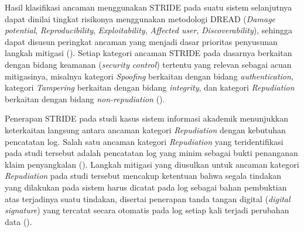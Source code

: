 Hasil klasifikasi ancaman menggunakan STRIDE pada suatu sistem selanjutnya dapat dinilai tingkat risikonya menggunakan metodologi DREAD (\textit{Damage potential}, \textit{Reproducibility}, \textit{Exploitability}, \textit{Affected user}, \textit{Discoverability}), sehingga dapat disusun peringkat ancaman yang menjadi dasar prioritas penyusunan langkah mitigasi (\cite{laksono2021stride}). Setiap kategori ancaman STRIDE pada dasarnya berkaitan dengan bidang keamanan (\textit{security control}) tertentu yang relevan sebagai acuan mitigasinya, misalnya kategori \textit{Spoofing} berkaitan dengan bidang \textit{authentication}, kategori \textit{Tampering} berkaitan dengan bidang \textit{integrity}, dan kategori \textit{Repudiation} berkaitan dengan bidang \textit{non-repudiation} (\cite{laksono2021stride}).

Penerapan STRIDE pada studi kasus sistem informasi akademik menunjukkan keterkaitan langsung antara ancaman kategori \textit{Repudiation} dengan kebutuhan pencatatan log. Salah satu ancaman kategori \textit{Repudiation} yang teridentifikasi pada studi tersebut adalah pencatatan log yang minim sebagai bukti penanganan klaim penyangkalan (\cite{laksono2021stride}). Langkah mitigasi yang diusulkan untuk ancaman kategori \textit{Repudiation} pada studi tersebut mencakup ketentuan bahwa segala tindakan yang dilakukan pada sistem harus dicatat pada log sebagai bahan pembuktian atas terjadinya suatu tindakan, disertai penerapan tanda tangan digital (\textit{digital signature}) yang tercatat secara otomatis pada log setiap kali terjadi perubahan data (\cite{laksono2021stride}).

%

